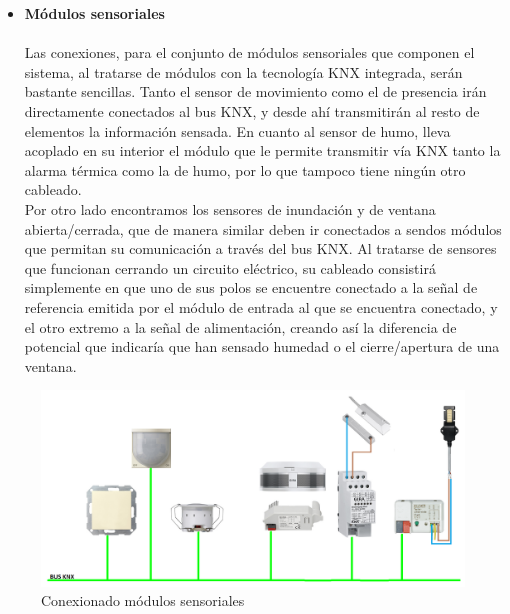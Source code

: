 \begin{itemize}
\item \textbf{Módulos sensoriales} \\ \\
Las conexiones, para el conjunto de módulos sensoriales que componen el sistema, al tratarse de módulos con la tecnología KNX integrada, serán bastante sencillas. Tanto el sensor de movimiento como el de presencia irán directamente conectados al bus KNX, y desde ahí transmitirán al resto de elementos la información sensada. En cuanto al sensor de humo, lleva acoplado en su interior el módulo que le permite transmitir vía KNX tanto la alarma térmica como la de humo, por lo que tampoco tiene ningún otro cableado.\\
Por otro lado encontramos los sensores de inundación y de ventana abierta/cerrada, que de manera similar deben ir conectados a sendos módulos que permitan su comunicación a través del bus KNX. Al tratarse de sensores que funcionan cerrando un circuito eléctrico, su cableado consistirá simplemente en que uno de sus polos se encuentre conectado a la señal de referencia emitida por el módulo de entrada al que se encuentra conectado, y el otro extremo a la señal de alimentación, creando así la diferencia de potencial que indicaría que han sensado humedad o el cierre/apertura de una ventana.
\end{itemize} 
\begin{flushleft}
\begin{figure}[H]
\includegraphics[width=1.05\textwidth]{figures/conex_sensores.png}   
\caption{Conexionado módulos sensoriales}
\label{fig:conex_sensores}
\end{figure}
\end{flushleft}

